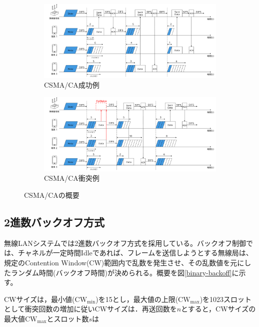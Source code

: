 \documentclass[a4paper,10pt]{ltjsarticle}
\begin{document}
\begin{figure}[H]
  \centering

  \begin{subfigure}{\textwidth}
    \centering
    \includegraphics[width=1\textwidth]{./assets/csma-ca-s.png}
    \caption{CSMA/CA成功例}
    \label{1a}
  \end{subfigure}


  \begin{subfigure}{\textwidth}
    \centering
    \includegraphics[width=1\textwidth]{./assets/csma-ca-f.png}
    \caption{CSMA/CA衝突例}
    \label{1b}
  \end{subfigure}


  \caption{CSMA/CAの概要}
  \label{CSMA/CA}
\end{figure}


\clearpage
\subsection{2進数バックオフ方式}

無線LANシステムでは2進数バックオフ方式を採用している。バックオフ制御では、チャネルが一定時間Idleであれば、フレームを送信しようとする無線局は、規定のContention Window(CW)範囲内で乱数を発生させ、その乱数値を元にしたランダム時間(バックオフ時間)が決められる。概要を図\ref{binary-backoff}に示す。


CWサイズは，最小値($\mathrm{CW_{min}}$)を15とし，最大値の上限($\mathrm{CW_{max}}$)を1023スロットとして衝突回数の増加に従いCWサイズは．再送回数を$n$とすると，CWサイズの最大値$\mathrm{CW}_{\max}$とスロット数$s$は
\end{document}

